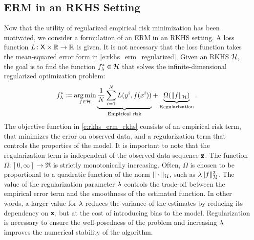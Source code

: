 \subsection{ERM in an RKHS Setting}
\label{s:erm_rkhs}
Now that the utility of regularized empirical risk minimization has been motivated, we consider a formulation of an ERM in an RKHS setting. A loss function $L \colon  {\sf X}\times \mathbb{R} \to\mathbb{R}$ is given. It is not necessary that the loss function takes the mean-squared error form in \eqref{e:rkhs_erm_regularized}. Given an RKHS ${\cal H}$, the goal is to find the function $f_\lambda^*\in{\cal H}$ that solves the infinite-dimensional regularized optimization problem:
\begin{equation}
f_\reg^* \eqdef \argmin_{f\in\clH} \underbrace{\frac{1}{N} \sum_{i=1}^N L(y^i,  f(x^i))}_{\text{Empirical risk}}    + \underbrace{\Omega(\| f\|_{\clH})}_{\text{Regularization}}.
\label{e:rkhs_erm_rkhs}
\end{equation}
The objective function in \eqref{e:rkhs_erm_rkhs} consists of an empirical risk term, that minimizes the error on observed data, and a regularization term that controls the properties of the model. It is important to note that the regularization term is independent of the observed data sequence $\bf{z}$. The function $\Omega : [0, \infty] \to \Re$ is strictly monotonically increasing. Often, $\Omega$ is chosen to be proportional to a quadratic function of the norm $\|\cdot\|_{\cal H}$, such as $\lambda \|f\|^2_{\cal H}$.  The value of the regularization parameter $\lambda$ controls the trade-off between the empirical error term and the smoothness of the estimated function. In other words, a larger value for $\lambda$ reduces the variance of the estimates by reducing its dependency on $\bf{z}$, but at the cost of introducing bias to the model. Regularization is necessary to ensure the well-posedness of the problem and increasing $\lambda$ improves the numerical stability of the algorithm. 

